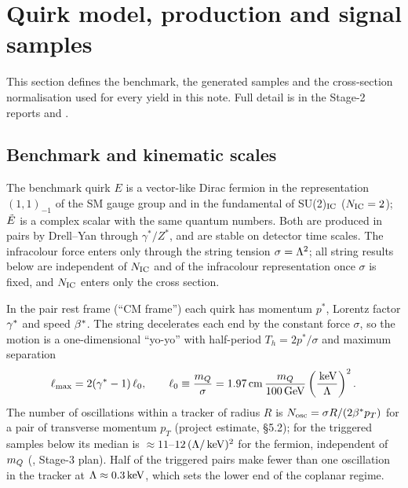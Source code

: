 \section{Quirk model, production and signal samples}\label{sec:model}

This section defines the benchmark, the generated samples and the cross-section normalisation used for every yield in
this note. Full detail is in the Stage-2 reports  and .

\subsection{Benchmark and kinematic scales}\label{sec:model:bench}
The benchmark quirk $E$ is a vector-like Dirac fermion in the representation $(1,1)_{-1}$ of the SM gauge group and in
the fundamental of SU(2)$_{\rm IC}$ ($N_{\rm IC}=2$); $\tilde{E}$ is a complex scalar with the same quantum numbers. Both
are produced in pairs by Drell--Yan through $\gamma^*/Z^*$, and are stable on detector time scales. The infracolour
force enters only through the string tension $\sigma=\Lambda^2$; all string results below are independent of $N_{\rm
IC}$ and of the infracolour representation once $\sigma$ is fixed, and $N_{\rm IC}$ enters only the cross section.

In the pair rest frame (``CM frame'') each quirk has momentum $p^*$, Lorentz factor $\gamma^*$ and speed $\beta^*$. The string
decelerates each end by the constant force $\sigma$, so the motion is a one-dimensional ``yo-yo'' with half-period
$T_h=2p^*/\sigma$ and maximum separation~\cite{Kang:2008ea}
\begin{equation}
  \ell_{\max} = 2(\gamma^*-1)\,\ell_0,\qquad \ell_0\equiv\frac{m_Q}{\sigma}
  = 1.97\,\mathrm{cm}\,\frac{m_Q}{100\,\mathrm{GeV}}\left(\frac{\,\mathrm{keV}}{\Lambda}\right)^2 .
  \label{eq:lmax}
\end{equation}
The number of oscillations within a tracker of radius $R$ is $N_{\rm osc}=\sigma R/(2\beta^* p_T)$ for a pair of transverse
momentum $p_T$ (project estimate,  \S5.2); for the triggered samples below its median is $\approx11$--$12\,(\Lambda/\,\mathrm{keV})^2$ for
the fermion, independent of $m_Q$ (\EST{}, Stage-3 plan). Half of the triggered pairs make fewer than one oscillation in
the tracker at $\Lambda\approx0.3\,\mathrm{keV}$, which sets the lower end of the coplanar regime.

